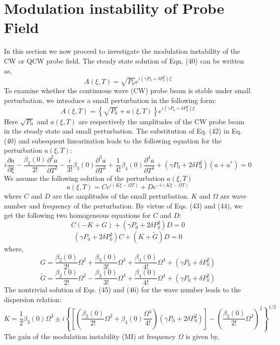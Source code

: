 \documentclass[12pt,a4paper]{article}
\begin{document}
\section{Modulation instability of Probe Field}

In this section we now proceed to investigate the modulation instability of the CW or QCW probe field. The steady state solution of Eqn. (40) can be written as,
\begin{equation}
A(\xi, T) = \sqrt{P_0} e^{i (\gamma P_0 + \delta P_0^2) \xi}
\end{equation}
To examine whether the continuous wave (CW) probe beam is stable under small perturbation, we introduce a small perturbation in the following form:
\begin{equation}
A(\xi, T) = \left\{ \sqrt{P_0} + a(\xi, T) \right\} e^{i (\gamma P_0 + \delta P_0^2) \xi}
\end{equation}
Here \( \sqrt{P_0} \) and \( a(\xi, T) \) are respectively the amplitudes of the CW probe beam in the steady state and small perturbation. The substitution of Eq. (42) in Eq. (40) and subsequent linearization leads to the following equation for the perturbation \( a(\xi, T) \):
\begin{equation}
i \frac{\partial a}{\partial \xi} - \frac{\beta_2(0)}{2!} \frac{\partial^2 a}{\partial T^2} - \frac{i}{3!} \beta_3(0) \frac{\partial^3 a}{\partial T^3} + \frac{1}{4!} \beta_4(0) \frac{\partial^4 a}{\partial T^4} + (\gamma P_0 + 2 \delta P_0^2)(a + a^*) = 0
\end{equation}
We assume the following solution of the perturbation \( a(\xi, T) \)
\begin{equation}
a(\xi, T) = C e^{i(K \xi - \Omega T)} + D e^{-i(K \xi - \Omega T)}
\end{equation}
where \( C \) and \( D \) are the amplitudes of the small perturbation. \( K \) and \( \Omega \) are wave number and frequency of the perturbation. By virtue of Eqs. (43) and (44), we get the following two homogeneous equations for \( C \) and \( D \):
\begin{equation}
C(-K + G) + (\gamma P_0 + 2 \delta P_0^2) D = 0
\end{equation}
\begin{equation}
(\gamma P_0 + 2 \delta P_0^2) C + (K + \tilde{G}) D = 0
\end{equation}
where,
\[
G = \frac{\beta_2(0)}{2!} \Omega^2 + \frac{\beta_3(0)}{3!} \Omega^3 + \frac{\beta_4(0)}{4!} \Omega^4 + (\gamma P_0 + \delta P_0^2)
\]
\[
\tilde{G} = \frac{\beta_2(0)}{2!} \Omega^2 - \frac{\beta_3(0)}{3!} \Omega^3 + \frac{\beta_4(0)}{4!} \Omega^4 + (\gamma P_0 + \delta P_0^2)
\]
The nontrivial solution of Eqs. (45) and (46) for the wave number leads to the dispersion relation:
\begin{equation}
K = \frac{1}{2} \beta_3(0) \Omega^3 \pm i {\left\{ \left[ \left( \frac{\beta_2(0)}{2!} \Omega^2 + \beta_4(0) \frac{\Omega^4}{4!} \right) \left( \gamma P_0 + 2 \delta P_0^2 \right) \right] - {\left( \frac{\beta_2(0)}{2!} \Omega^2 \right)}^2 \right\}}^{1/2}
\end{equation}
The gain of the modulation instability (MI) at frequency \( \Omega \) is given by,
\end{document}
